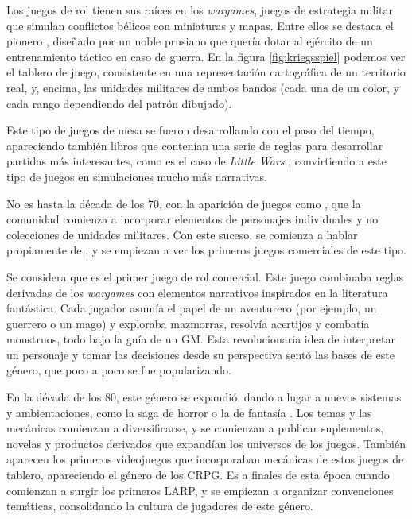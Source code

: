 
Los juegos de rol tienen sus raíces en los \textit{wargames}, juegos de estrategia militar que simulan conflictos bélicos con miniaturas y mapas. Entre ellos se destaca el pionero \cite{kriegsspiel}, diseñado por un noble prusiano que quería dotar al ejército de un entrenamiento táctico en caso de guerra. En la figura \ref{fig:kriegsspiel} podemos ver el tablero de juego, consistente en una representación cartográfica de un territorio real, y, encima, las unidades militares de ambos bandos (cada una de un color, y cada rango dependiendo del patrón dibujado).

\smallskip

Este tipo de juegos de mesa se fueron desarrollando con el paso del tiempo, apareciendo también libros que contenían una serie de reglas para desarrollar partidas más interesantes, como es el caso de \textit{Little Wars} \citep{littlewars}, convirtiendo a este tipo de juegos en simulaciones mucho más narrativas.

\medskip

No es hasta la década de los 70, con la aparición de juegos como \cite{chainmail}, que la comunidad comienza a incorporar elementos de personajes individuales y no colecciones de unidades militares. Con este suceso, se comienza a hablar propiamente de , y se empiezan a ver los primeros juegos comerciales de este tipo.

\medskip

Se considera que \cite{ogdnd} es el primer juego de rol comercial. Este juego combinaba reglas derivadas de los \textit{wargames} con elementos narrativos inspirados en la literatura fantástica. Cada jugador asumía el papel de un aventurero (por ejemplo, un guerrero o un mago) y exploraba mazmorras, resolvía acertijos y combatía monstruos, todo bajo la guía de un GM. Esta revolucionaria idea de interpretar un personaje y tomar las decisiones desde su perspectiva sentó las bases de este género, que poco a poco se fue popularizando.

\medskip

En la década de los 80, este género se expandió, dando a lugar a nuevos sistemas y ambientaciones, como la saga de horror \cite{cthulhu} o la de fantasía \cite{rq}. Los temas y las mecánicas comienzan a diversificarse, y se comienzan a publicar suplementos, novelas y productos derivados que expandían los universos de los juegos. También aparecen los primeros videojuegos que incorporaban mecánicas de estos juegos de tablero, apareciendo el género de los CRPG. Es a finales de esta época cuando comienzan a surgir los primeros LARP, y se empiezan a organizar convenciones temáticas, consolidando la cultura de jugadores de este género.

